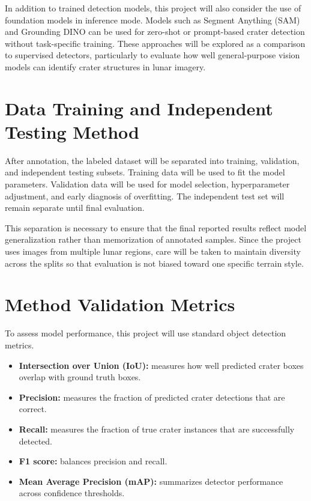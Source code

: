 \documentclass[conference]{IEEEtran}
\begin{document}
	In addition to trained detection models, this project will also consider the use of foundation models in inference mode. Models such as Segment Anything (SAM) and Grounding DINO can be used for zero-shot or prompt-based crater detection without task-specific training. These approaches will be explored as a comparison to supervised detectors, particularly to evaluate how well general-purpose vision models can identify crater structures in lunar imagery.
	
	\section{Data Training and Independent Testing Method}
	After annotation, the labeled dataset will be separated into training, validation, and independent testing subsets. Training data will be used to fit the model parameters. Validation data will be used for model selection, hyperparameter adjustment, and early diagnosis of overfitting. The independent test set will remain separate until final evaluation.
	
	This separation is necessary to ensure that the final reported results reflect model generalization rather than memorization of annotated samples. Since the project uses images from multiple lunar regions, care will be taken to maintain diversity across the splits so that evaluation is not biased toward one specific terrain style.
	
	\section{Method Validation Metrics}
	To assess model performance, this project will use standard object detection metrics.
	
	\begin{itemize}
		\item \textbf{Intersection over Union (IoU):} measures how well predicted crater boxes overlap with ground truth boxes.
		\item \textbf{Precision:} measures the fraction of predicted crater detections that are correct.
		\item \textbf{Recall:} measures the fraction of true crater instances that are successfully detected.
		\item \textbf{F1 score:} balances precision and recall.
		\item \textbf{Mean Average Precision (mAP):} summarizes detector performance across confidence thresholds.
	\end{itemize}
	
\end{document}
